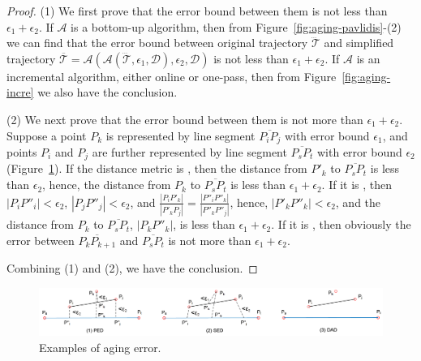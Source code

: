 \begin{proof} 	
	(1) We first prove that the  error bound between them is not less than $\epsilon_1+ \epsilon_2$.
	If $\mathcal{A}$ is a bottom-up algorithm, then from Figure~\ref{fig:aging-pavlidis}-(2) we can find that the error bound between original trajectory $\dddot{\mathcal{T}}$ and simplified trajectory $\overline{\mathcal{T}}=\mathcal{A}(\mathcal{A}(\dddot{\mathcal{T}}, \epsilon_1, \mathcal{D}), \epsilon_2, \mathcal{D})$ is not less than $\epsilon_1+ \epsilon_2$.
	If $\mathcal{A}$ is an incremental algorithm, either online or one-pass, then from Figure~\ref{fig:aging-incre} we also have the conclusion.
	
	(2) We next prove that the error bound between them is not more than $\epsilon_1+ \epsilon_2$. Suppose a point $P_k$ is represented by line segment $\overline{P_iP_j}$ with error bound $\epsilon_1$, and points $P_i$ and $P_j$ are further represented by line segment $\overline{P_sP_t}$ with error bound $\epsilon_2$ (Figure~\ref{fig:aging-error}).
	If the distance metric is \ped, then the distance from $P'_k$ to $\overline{P_sP_t}$ is less than $\epsilon_2$, hence, the distance from $P_k$ to $\overline{P_sP_t}$ is less than $\epsilon_1 + \epsilon_2$.
	If it is \sed, then $|P_iP''_i|<\epsilon_2$, $|P_jP''_j|<\epsilon_2$, and $\frac{|P_iP'_k|}{|P'_kP_j|} = \frac{|P''_iP''_k|}{|P''_kP''_j|}$, hence, $|P'_kP''_k|<\epsilon_2$, and the distance from $P_k$ to $\overline{P_sP_t}$, \ie $|P_kP''_k|$, is less than $\epsilon_1 + \epsilon_2$.
	If it is \dad, then obviously the error between $\overline{P_kP_{k+1}}$ and $\overline{P_sP_t}$ is not more than $\epsilon_1+ \epsilon_2$.
	

	
	Combining (1) and (2), we have the conclusion.
\end{proof}

\begin{figure}[tb!]
	\centering
	\includegraphics[scale=0.6]{Figures/Fig-aging-error.png}
	
	\caption{\small Examples of aging error.}
	\vspace{-2ex}
	\label{fig:aging-error}
\end{figure}